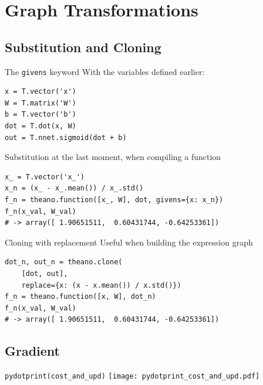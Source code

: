 \documentclass[a4paper,9pt]{beamer}
\begin{document}
\section{Graph Transformations}
\begin{frame}
  \tableofcontents[currentsection]
\end{frame}

\subsection{Substitution and Cloning}
\begin{frame}[fragile]{The {\tt givens} keyword}
  With the variables defined earlier:
  \begin{verbatim}
x = T.vector('x')
W = T.matrix('W')
b = T.vector('b')
dot = T.dot(x, W)
out = T.nnet.sigmoid(dot + b)
  \end{verbatim}

  Substitution at the last moment, when compiling a function
  \begin{verbatim}
x_ = T.vector('x_')
x_n = (x_ - x_.mean()) / x_.std()
f_n = theano.function([x_, W], dot, givens={x: x_n})
f_n(x_val, W_val)
# -> array([ 1.90651511,  0.60431744, -0.64253361])
  \end{verbatim}
\end{frame}

\begin{frame}[fragile]{Cloning with replacement}
  Useful when building the expression graph
  \begin{verbatim}
dot_n, out_n = theano.clone(
    [dot, out],
    replace={x: (x - x.mean()) / x.std()})
f_n = theano.function([x, W], dot_n)
f_n(x_val, W_val)
# -> array([ 1.90651511,  0.60431744, -0.64253361])
  \end{verbatim}
\end{frame}

\subsection{Gradient}


\begin{frame}{\tt pydotprint(cost\_and\_upd)}
  \texttt{[image: pydotprint\_cost\_and\_upd.pdf]}
\end{frame}
\end{document}
